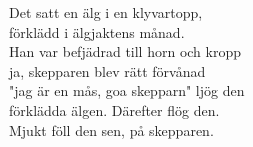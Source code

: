\vspace{10pt}
Det satt en älg i en klyvartopp,\\
förklädd i älgjaktens månad.\\
Han var befjädrad till horn och kropp\\
ja, skepparen blev rätt förvånad\\
"jag är en mås, goa skepparn" ljög den\\
förklädda älgen. Därefter flög den.\\
Mjukt föll den sen, på skepparen.

